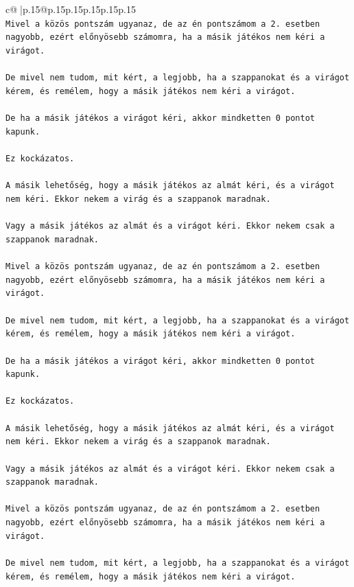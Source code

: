 \documentclass{article}
\begin{document}
{\begin{supertabular}{c@{$\;$}|p{.15\linewidth}@{}p{.15\linewidth}p{.15\linewidth}p{.15\linewidth}p{.15\linewidth}p{.15\linewidth}}
{{{\\ 
\texttt{Mivel a közös pontszám ugyanaz, de az én pontszámom a 2. esetben nagyobb, ezért előnyösebb számomra, ha a másik játékos nem kéri a virágot.} \\
\\ 
\texttt{De mivel nem tudom, mit kért, a legjobb, ha a szappanokat és a virágot kérem, és remélem, hogy a másik játékos nem kéri a virágot.} \\
\\ 
\texttt{De ha a másik játékos a virágot kéri, akkor mindketten 0 pontot kapunk.} \\
\\ 
\texttt{Ez kockázatos.} \\
\\ 
\texttt{A másik lehetőség, hogy a másik játékos az almát kéri, és a virágot nem kéri. Ekkor nekem a virág és a szappanok maradnak.} \\
\\ 
\texttt{Vagy a másik játékos az almát és a virágot kéri. Ekkor nekem csak a szappanok maradnak.} \\
\\ 
\texttt{Mivel a közös pontszám ugyanaz, de az én pontszámom a 2. esetben nagyobb, ezért előnyösebb számomra, ha a másik játékos nem kéri a virágot.} \\
\\ 
\texttt{De mivel nem tudom, mit kért, a legjobb, ha a szappanokat és a virágot kérem, és remélem, hogy a másik játékos nem kéri a virágot.} \\
\\ 
\texttt{De ha a másik játékos a virágot kéri, akkor mindketten 0 pontot kapunk.} \\
\\ 
\texttt{Ez kockázatos.} \\
\\ 
\texttt{A másik lehetőség, hogy a másik játékos az almát kéri, és a virágot nem kéri. Ekkor nekem a virág és a szappanok maradnak.} \\
\\ 
\texttt{Vagy a másik játékos az almát és a virágot kéri. Ekkor nekem csak a szappanok maradnak.} \\
\\ 
\texttt{Mivel a közös pontszám ugyanaz, de az én pontszámom a 2. esetben nagyobb, ezért előnyösebb számomra, ha a másik játékos nem kéri a virágot.} \\
\\ 
\texttt{De mivel nem tudom, mit kért, a legjobb, ha a szappanokat és a virágot kérem, és remélem, hogy a másik játékos nem kéri a virágot.} \\
}}}
\end{supertabular}}
\end{document}
